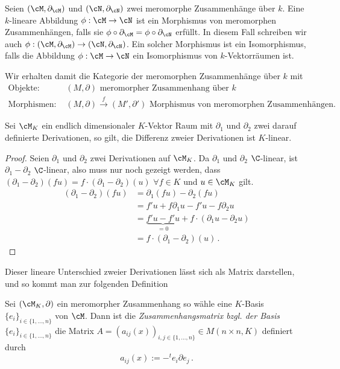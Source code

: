 \begin{defn}
Seien $(\cM,\partial_\cM)$ und $(\cN,\partial_\cN)$ zwei meromorphe
Zusammenhänge über $k$. Eine $k$-lineare Abbildung $\phi:\cM\rightarrow\cN$
ist ein Morphismus von meromorphen Zusammenhängen, falls sie
$\phi\circ\partial_\cM=\phi\circ\partial_\cN$ erfüllt. In diesem Fall
schreiben wir auch $\phi:(\cM,\partial_\cM)\rightarrow(\cN,\partial_\cN)$.
Ein solcher Morphismus ist ein Isomorphismus, falls die Abbildung
$\phi:\cM\rightarrow\cN$ ein Isomorphismus von $k$-Vektorräumen ist.
\end{defn}

\begin{comment}
TODO: entfernen
\end{comment}
\begin{defn}
Wir erhalten damit die Kategorie der meromorphen Zusammenhänge über $k$ mit
\begin{align*}
\text{Objekte: } & (M,\partial)\text{ meromorpher Zusammenhang über }k
\\\text{Morphismen: } & (M,\partial)\overset{f}{\rightarrow}(M',\partial')
  \text{ Morphismus von meromorphen Zusammenhängen.}
\end{align*}
\end{defn}

\begin{lem} Sei $\cM_K$ ein endlich dimensionaler $K$-Vektor Raum mit
$\partial_1$ und $\partial_2$ zwei darauf definierte Derivationen, so gilt, die
Differenz zweier Derivationen ist $K$-linear.
\end{lem}
\begin{proof}
Seien $\partial_1$ und $\partial_2$ zwei Derivationen auf $\cM_K$.
Da $\partial_1$ und $\partial_2$ $\C$-linear, ist $\partial_1-\partial_2$
$\C$-linear, also muss nur noch gezeigt werden, dass
$(\partial_1-\partial_2)(fu)=f\cdot(\partial_1-\partial_2)(u)$ $\forall f\in
K$ und $u\in\cM_K$ gilt.\\
\begin{align*}
(\partial_1-\partial_2)(fu) &= \partial_1(fu)-\partial_2(fu)\\
&= f'u+f\partial_1u-f'u-f\partial_2u\\
&= \underset{=0}{\underbrace{f'u-f'u}}+f\cdot(\partial_1u-\partial_2u)\\
&= f\cdot(\partial_1-\partial_2)(u) \,.
\end{align*}
\end{proof}
Dieser lineare Unterschied zweier Derivationen lässt sich als Matrix
darstellen, und so kommt man zur folgenden Definition
\begin{comment}
\cite[Seite 129]{hotta2007d}
\end{comment}
\begin{defn}[Zusammenhangsmatrix]
Sei $(\cM_K,\partial)$ ein meromorpher Zusammenhang so wähle eine $K$-Basis
$\{e_i\}_{i\in\{1,\dots,n\}}$ von $\cM$. Dann ist die
\emph{Zusammenhangsmatrix bzgl. der Basis $\{e_i\}_{i\in\{1,\dots,n\}}$} die
Matrix $A=(a_{ij}(x))_{i,j\in\{1,\dots,n\}}\in M(n\times n,K)$ definiert
durch
\[ 
a_{ij}(x) := -^te_i \partial e_j \,. 
\]
\end{defn}

